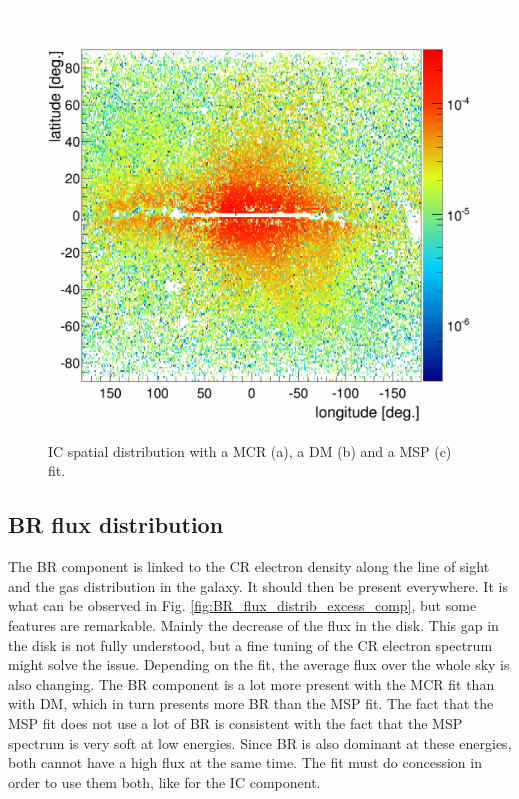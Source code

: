 \begin{figure}[h]
\begin{minipage}[h]{0.4\textwidth}
	  \label{}
  \end{minipage}
  \hfill
  \begin{minipage}[h]{0.4\textwidth}
	  \centering
	  \includegraphics[width=1.\linewidth]{pic/discussion/MSPonly_fine_IC_integral_distribution.png}
	  \label{}
  \end{minipage}
  \caption[IC spatial distributions.]{IC spatial distribution with a MCR (a), a DM (b) and a MSP (c) fit.}
  \label{fig:IC_flux_distrib_excess_comp}	 
\end{figure}

\newpage
\subsection{BR flux distribution}
The BR component is linked to the CR electron density along the line of sight and the gas distribution in the galaxy. It should then be present everywhere. It is what can be observed in Fig. \ref{fig:BR_flux_distrib_excess_comp}, but some features are remarkable. Mainly the decrease of the flux in the disk. This gap in the disk is not fully understood, but a fine tuning of the CR electron spectrum might solve the issue.
Depending on the fit, the average flux over the whole sky is also changing. The BR component is a lot more present with the MCR fit than with DM, which in turn presents more BR than the MSP fit. The fact that the MSP fit does not use a lot of BR is consistent with the fact that the MSP spectrum is very soft at low energies. Since BR is also dominant at these energies, both cannot have a high flux at the same time. The fit must do concession in order to use them both, like for the IC component.

